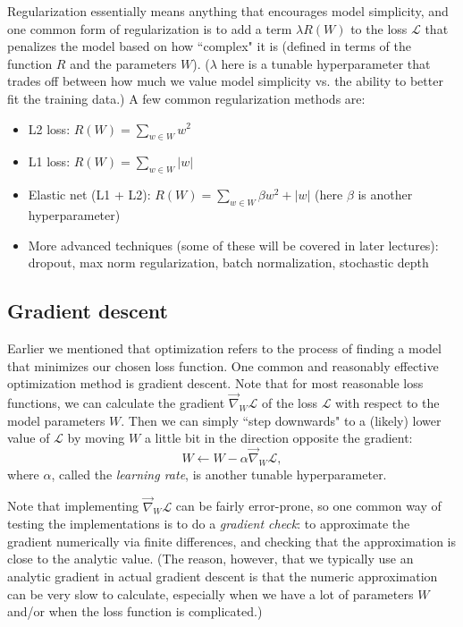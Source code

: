 Regularization essentially means anything that encourages model simplicity, and one common form of regularization is to add a term $\lambda R(W)$ to the loss $\mathcal{L}$ that penalizes the model based on how ``complex" it is (defined in terms of the function $R$ and the parameters $W$). ($\lambda$ here is a tunable hyperparameter that trades off between how much we value model simplicity vs. the ability to better fit the training data.) A few common regularization methods are:
\begin{itemize}
\item L2 loss: $R(W) = \sum_{w \in W} w^2$
\item L1 loss: $R(W) = \sum_{w \in W} |w|$
\item Elastic net (L1 + L2): $R(W) = \sum_{w \in W} \beta w^2 + |w|$ (here $\beta$ is another hyperparameter)
\item More advanced techniques (some of these will be covered in later lectures): dropout, max norm regularization, batch normalization, stochastic depth
\end{itemize}

\subsection{Gradient descent}
Earlier we mentioned that optimization refers to the process of finding a model that minimizes our chosen loss function. One common and reasonably effective optimization method is gradient descent. Note that for most reasonable loss functions, we can calculate the gradient $\overrightarrow{\nabla}_W\mathcal{L}$ of the loss $\mathcal{L}$ with respect to the model parameters $W$. Then we can simply ``step downwards" to a (likely) lower value of $\mathcal{L}$ by moving $W$ a little bit in the direction opposite the gradient:
$$W \leftarrow W - \alpha \overrightarrow{\nabla}_W\mathcal{L},$$
where $\alpha$, called the \emph{learning rate}, is another tunable hyperparameter.

Note that implementing $\overrightarrow{\nabla}_W\mathcal{L}$ can be fairly error-prone, so one common way of testing the implementations is to do a \emph{gradient check}: to approximate the gradient numerically via finite differences, and checking that the approximation is close to the analytic value. (The reason, however, that we typically use an analytic gradient in actual gradient descent is that the numeric approximation can be very slow to calculate, especially when we have a lot of parameters $W$ and/or when the loss function is complicated.)

